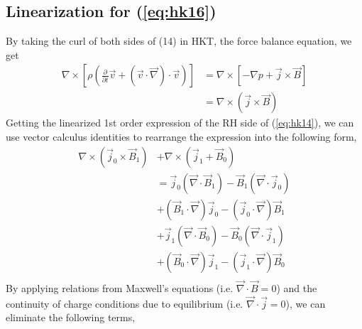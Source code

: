 \documentclass{article}
\begin{document}
\subsection{Linearization for (\ref{eq:hk16})}
By taking the curl of both sides of (14) in HKT, the force balance equation, we get
\begin{equation}
    \label{eq:hk14}
    \begin{split}
        \nabla \times \left[\rho \left( \frac{\partial}{\partial t} \vec{v} + \left( \vec{v} \cdot \vec{\nabla} \right) \cdot \vec{v} \right)\right] &= \nabla \times \left[- \nabla p + \vec{j}\times \vec{B}\right] \\
                                                                                                                                                     &= \nabla \times \left( \vec{j}\times \vec{B} \right) 
    \end{split}
\end{equation} 
Getting the linearized 1st order expression of the RH side of (\ref{eq:hk14}), we can use vector calculus identities to rearrange the expression into the following form,
\begin{equation}
    \begin{split}
        \nabla \times \left( \vec{j}_0 \times \vec{B}_1 \right) &+ \nabla \times \left( \vec{j}_1 + \vec{B}_0 \right) \\
                                                                &= \vec{j}_0 (\vec{\nabla} \cdot \vec{B}_1) - \vec{B}_1 (\vec{\nabla} \cdot \vec{j}_0) \\
                                                                &+ \left( \vec{B}_1 \cdot \vec{\nabla}  \right) \vec{j}_0 - \left( \vec{j}_0 \cdot  \vec{\nabla}  \right) \vec{B}_1 \\
                                                                &+ \vec{j}_1 (\vec{\nabla} \cdot \vec{B}_0) - \vec{B}_0 (\vec{\nabla} \cdot \vec{j}_1) \\
                                                                &+ \left( \vec{B}_0 \cdot \vec{\nabla}  \right) \vec{j}_1 - \left( \vec{j}_1 \cdot  \vec{\nabla}  \right) \vec{B}_0 \\
    \end{split}
\end{equation} 
By applying relations from Maxwell's equations (i.e. $\vec{\nabla} \cdot \vec{B}=0$) and the continuity of charge conditions due to equilibrium (i.e. $\vec{\nabla} \cdot \vec{j}=0$), we can eliminate the following terms,
\end{document}
